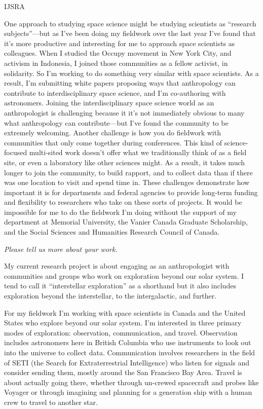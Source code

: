 \begin{labeling}{IJSRA}
	\item[MO-R] One approach to studying space science might be studying scientists as “research subjects”—but as I’ve been doing my fieldwork over the last year I’ve found that it’s more productive and interesting for me to approach space scientists as colleagues. When I studied the Occupy movement in New York City, and activism in Indonesia, I joined those communities as a fellow activist, in solidarity. So I’m working to do something very similar with space scientists. As a result, I’m submitting white papers proposing ways that anthropology can contribute to interdisciplinary space science, and I’m co-authoring with astronomers. Joining the interdisciplinary space science world as an anthropologist is challenging because it it's not immediately obvious to many what anthropology can contribute—but I’ve found the community to be extremely welcoming. Another challenge is how you do fieldwork with communities that only come together during conferences. This kind of science-focused multi-sited work doesn’t offer what we traditionally think of as a field site, or even a laboratory like other sciences might. As a result, it takes much longer to join the community, to build rapport, and to collect data than if there was one location to visit and spend time in. These challenges demonstrate how important it is for departments and federal agencies to provide long-term funding and flexibility to researchers who take on these sorts of projects. It would be impossible for me to do the fieldwork I’m doing without the support of my department at Memorial University, the Vanier Canada Graduate Scholarship, and the Social Sciences and Humanities Research Council of Canada.

	\item[IJSRA] \emph{Please tell us more about your work.}

	\item[MO-R] My current research project is about engaging as an anthropologist with communities and groups who work on exploration beyond our solar system. I tend to call it “interstellar exploration” as a shorthand but it also includes exploration beyond the interstellar, to the intergalactic, and further.

	For my fieldwork I’m working with space scientists in Canada and the United States who explore beyond our solar system. I’m interested in three primary modes of exploration: observation, communication, and travel. Observation includes astronomers here in British Columbia who use instruments to look out into the universe to collect data. Communication involves researchers in the field of SETI (the Search for Extraterrestrial Intelligence) who listen for signals and consider sending them, mostly around the San Francisco Bay Area. Travel is about actually going there, whether through un-crewed spacecraft and probes like Voyager or through imagining and planning for a generation ship with a human crew to travel to another star.


\end{labeling}
